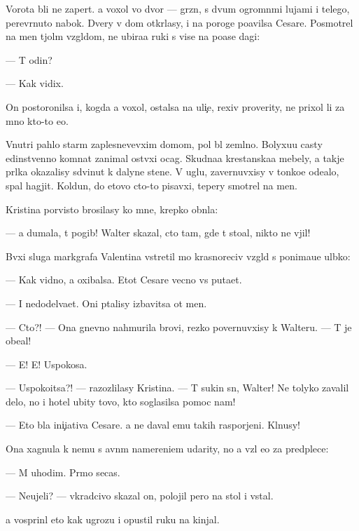 \documentclass[10pt]{book}
\begin{document}
Vorota b{\yi}li ne zapert{\yi}. {\Y}a  voxol vo dvor — gr{\ia}zn{\yi}{\y}, s dvum{\ia} ogromn{\yi}mi lujami i telego{\y}, perev{\e}rnuto{\y} nabok. Dvery v dom otkr{\yi}lasy, i na poroge po{\y}avilsa Cesare. Posmotrel na men{\ia} t{\ia}jol{\yi}m vzgl{\ia}dom, ne ubira{\y}a ruki s vis{\ia}{\x}e{\y} na po{\y}ase dagi:

— T{\yi} odin?

— Kak vidix.

On postoronilsa i, kogda {\y}a  voxol, ostalsa na uli{\c}e, rexiv proverity, ne prixol li za mno{\y} kto-to {\y}e{\x}o.

Vnutri pahlo star{\yi}m zaplesnevevxim domom, pol b{\yi}l zeml{\ia}no{\y}. Bolyxu{\y}u casty {\y}edinstvenno{\y} komnat{\yi} zanimal ost{\yi}vxi{\y} ocag. Skudna{\y}a krest{\y}anska{\y}a mebely, a takje pr{\ia}lka okazalisy sdvinut{\yi} k dalyne{\y} stene. V uglu, zavernuvxisy v tonko{\y}e ode{\y}alo, spal hagjit. Koldun, do etovo cto-to pisavxi{\y}, tepery smotrel na men{\ia}.

Kristina por{\yi}visto brosilasy ko mne, krepko obn{\ia}la:

— {\Y}a dumala, t{\yi} pogib! Walter skazal, cto tam, gde t{\yi} sto{\y}al, nikto ne v{\yi}jil!

B{\yi}vxi{\y} sluga markgrafa Valentina vstretil mo{\y} krasnoreciv{\yi}{\y} vzgl{\ia}d s po\-ni\-ma\-{\y}u\-{\x}e{\y} ul{\yi}bko{\y}:

— Kak vidno, {\y}a oxibalsa. Etot Cesare vecno vs{\e} puta{\y}et.

— I nedodel{\yi}va{\y}et. Oni p{\yi}talisy izbavitsa ot men{\ia}.

— Cto?! — Ona gnevno nahmurila brovi, rezko povernuvxisy k Walteru. — T{\yi} je obe{\x}al!

— E{\y}! E{\y}! Uspoko{\y}sa.

— Uspoko{\y}itsa?! — razozlilasy Kristina. — T{\yi} sukin s{\yi}n, Walter! Ne tolyko zavalil delo, no i hotel ubity tovo, kto soglasilsa pomoc nam!

— Eto b{\yi}la ini{\c}iativa Cesare. {\Y}a ne daval {\y}emu takih raspor{\ia}jeni{\y}. Kl{\ia}nusy!

Ona xagnula k nemu s {\y}avn{\yi}m namereni{\y}em udarity, no {\y}a vz{\ia}l {\y}e{\y}o za predplec{\y}e:

— M{\yi} uhodim. Pr{\ia}mo se{\y}cas.

— Neujeli? — vkradcivo skazal on, polojil pero na stol i vstal.

{\Y}a vosprin{\ia}l eto kak ugrozu i opustil ruku na kinjal.
\end{document}
